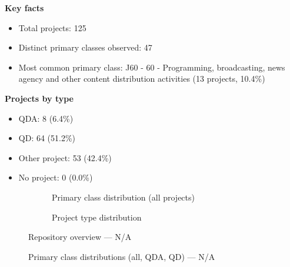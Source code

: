 \textbf{Key facts}

\begin{itemize}
    \item Total projects: 125
    \item Distinct primary classes observed: 47
    \item Most common primary class: J60 - 60 - Programming, broadcasting, news agency and other content distribution activities (13 projects, 10.4\%)
\end{itemize}

\textbf{Projects by type}

\begin{itemize}
    \item QDA: 8 (6.4\%)
    \item QD: 64 (51.2\%)
    \item Other project: 53 (42.4\%)
    \item No project: 0 (0.0\%)
\end{itemize}

\begin{figure}[H]
    \centering
    \begin{subfigure}[t]{0.49\textwidth}
        \centering
        
        \caption{Primary class distribution (all projects)}
    \end{subfigure}
    \hfill
    \begin{subfigure}[t]{0.49\textwidth}
        \centering
        
        \caption{Project type distribution}
    \end{subfigure}
    \caption{Repository overview --- N/A}
\end{figure}

\clearpage

\begin{figure}[H]
    \centering
    
    \par\vspace{0.8em}
    
    \par\vspace{0.8em}
    
    \caption{Primary class distributions (all, QDA, QD) --- N/A}
\end{figure}

